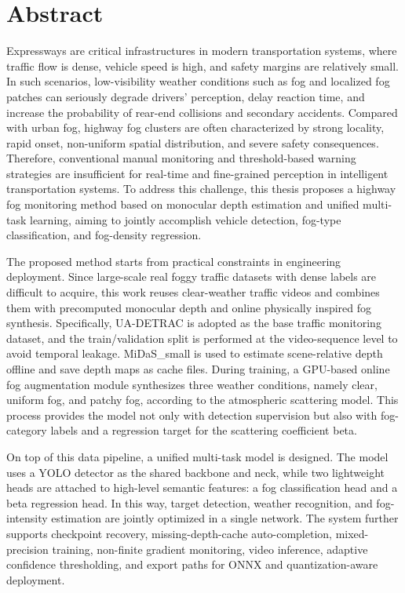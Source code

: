 \chapter*{Abstract}
\thispagestyle{plain}

Expressways are critical infrastructures in modern transportation systems, where traffic flow is dense, vehicle speed is high, and safety margins are relatively small. In such scenarios, low-visibility weather conditions such as fog and localized fog patches can seriously degrade drivers’ perception, delay reaction time, and increase the probability of rear-end collisions and secondary accidents. Compared with urban fog, highway fog clusters are often characterized by strong locality, rapid onset, non-uniform spatial distribution, and severe safety consequences. Therefore, conventional manual monitoring and threshold-based warning strategies are insufficient for real-time and fine-grained perception in intelligent transportation systems. To address this challenge, this thesis proposes a highway fog monitoring method based on monocular depth estimation and unified multi-task learning, aiming to jointly accomplish vehicle detection, fog-type classification, and fog-density regression.

The proposed method starts from practical constraints in engineering deployment. Since large-scale real foggy traffic datasets with dense labels are difficult to acquire, this work reuses clear-weather traffic videos and combines them with precomputed monocular depth and online physically inspired fog synthesis. Specifically, UA-DETRAC is adopted as the base traffic monitoring dataset, and the train/validation split is performed at the video-sequence level to avoid temporal leakage. MiDaS\_small is used to estimate scene-relative depth offline and save depth maps as cache files. During training, a GPU-based online fog augmentation module synthesizes three weather conditions, namely clear, uniform fog, and patchy fog, according to the atmospheric scattering model. This process provides the model not only with detection supervision but also with fog-category labels and a regression target for the scattering coefficient beta.

On top of this data pipeline, a unified multi-task model is designed. The model uses a YOLO detector as the shared backbone and neck, while two lightweight heads are attached to high-level semantic features: a fog classification head and a beta regression head. In this way, target detection, weather recognition, and fog-intensity estimation are jointly optimized in a single network. The system further supports checkpoint recovery, missing-depth-cache auto-completion, mixed-precision training, non-finite gradient monitoring, video inference, adaptive confidence thresholding, and export paths for ONNX and quantization-aware deployment.

